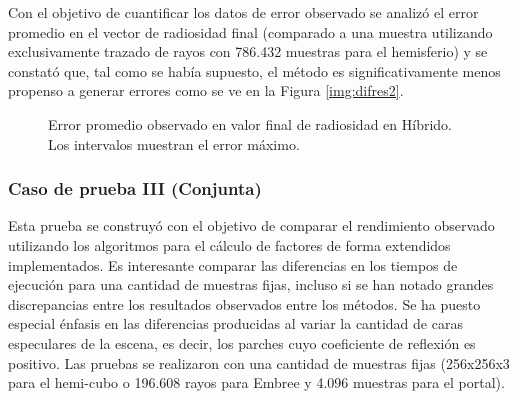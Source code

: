 Con el objetivo de cuantificar los datos de error observado se analizó el error promedio en el vector de radiosidad final (comparado a una muestra utilizando exclusivamente trazado de rayos con 786.432 muestras para el hemisferio) y se constató que, tal como se había supuesto, el método es significativamente menos propenso a generar errores como se ve en la Figura \ref{img:difres2}.

\begin{figure}[htbp!]
\caption{Error promedio observado en valor final de radiosidad en Híbrido. Los intervalos muestran el error máximo.}
\label{plot:errorcII}
\end{figure}

\subsubsection{Caso de prueba III (Conjunta)}

Esta prueba se construyó con el objetivo de comparar el rendimiento observado utilizando los algoritmos para el cálculo de factores de forma extendidos implementados. Es interesante comparar las diferencias en los tiempos de ejecución para una cantidad de muestras fijas, incluso si se han notado grandes discrepancias entre los resultados observados entre los métodos. Se ha puesto especial énfasis en las diferencias producidas al variar la cantidad de caras especulares de la escena, es decir, los parches cuyo coeficiente de reflexión es positivo. Las pruebas se realizaron con una cantidad de muestras fijas (256x256x3 para el hemi-cubo o 196.608 rayos para Embree y 4.096 muestras para el portal).

